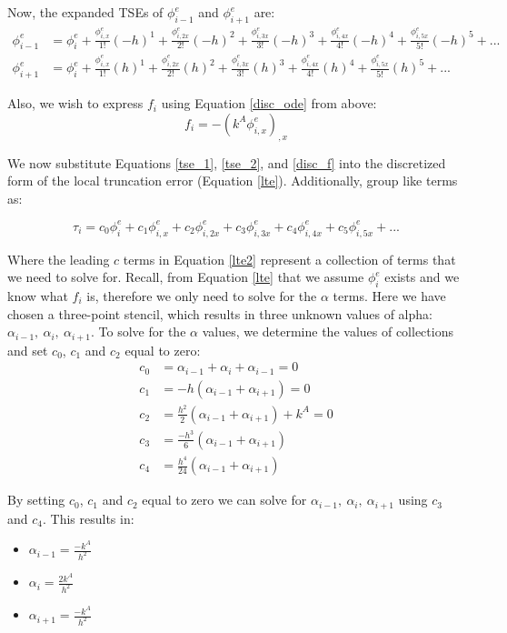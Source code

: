 \documentclass[letterpaper, 10pt, oneside]{article}
\newcommand{\be}{\begin{equation}}
\newcommand{\ee}{\end{equation}}
\newcommand{\as}[1]{\begin{align*}#1\end{align*}}
\newcommand{\an}[1]{\begin{align}#1\end{align}}
\newcommand{\bi}{\begin{itemize}}
\newcommand{\ei}{\end{itemize}}
\begin{document}
Now, the expanded TSEs of $\phi_{i-1}^e$ and $\phi_{i+1}^e$ are:
\an{
	\phi^e_{i-1} &= \phi^{e}_i + \frac{\phi^{e}_{i,x}}{1!}(-h)^1 + \frac{\phi^{e}_{i,2x}}{2!}(-h)^2 + \frac{\phi^{e}_{i,3x}}{3!}(-h)^3 + \frac{\phi^{e}_{i,4x}}{4!}(-h)^4 + \frac{\phi^{e}_{i,5x}}{5!}(-h)^5 + ...\label{tse_1} \\
	\phi^e_{i+1} &= \phi^{e}_i + \frac{\phi^{e}_{i,x}}{1!}(h)^1 + \frac{\phi^{e}_{i,2x}}{2!}(h)^2 + \frac{\phi^{e}_{i,3x}}{3!}(h)^3 + \frac{\phi^{e}_{i,4x}}{4!}(h)^4 + \frac{\phi^{e}_{i,5x}}{5!}(h)^5 + ...\label{tse_2}}

Also, we wish to express $f_i$ using Equation \ref{disc_ode} from above:
\be f_i = -(k^A \phi_{i,x}^e)_{,x} \label{disc_f} \ee

We now substitute Equations \ref{tse_1}, \ref{tse_2},  and \ref{disc_f} into the discretized form of the local truncation error (Equation \ref{lte}).  Additionally, group like terms as:

\be	\tau_i = c_0 \phi^e_{i} + c_1\phi^e_{i,x} +c_2 \phi^e_{i,2x} +c_3 \phi^e_{i,3x} + c_4 \phi^e_{i,4x} +c_5 \phi^e_{i,5x} + ...\label{lte2}\ee

Where the leading $c$ terms in Equation \ref{lte2} represent a collection of terms that we need to solve for.  Recall, from Equation \ref{lte} that we assume $\phi^e_i$ exists and we know what $f_i$ is, therefore we only need to solve for the $\alpha$ terms.  Here we have chosen a three-point stencil, which results in three unknown values of alpha: $\alpha_{i-1}, \ \alpha_i , \ \alpha_{i+1}$.  To solve for the $\alpha$ values, we determine the values of collections and set $c_0$, $c_1$ and $c_2$ equal to zero:
\as{c_0 &=\alpha_{i-1} + \alpha_i + \alpha_{i-1} = 0\\
	c_1&= -h \left( \alpha_{i-1} + \alpha_{i+1} \right) = 0 \\
	c_2&=\frac{h^2}{2}\left( \alpha_{i-1} + \alpha_{i+1} \right) + k^A = 0\\
	c_3&=\frac{-h^3}{6}\left( \alpha_{i-1} + \alpha_{i+1} \right) \\
	c_4&=\frac{h^4}{24}\left( \alpha_{i-1} + \alpha_{i+1} \right) }

 By setting $c_0$, $c_1$ and $c_2$ equal to zero we can solve for $\alpha_{i-1}, \ \alpha_i , \ \alpha_{i+1}$ using $c_3$ and $c_4$.  This results in: 
\bi
	\item $\alpha_{i-1} = \frac{-k^A}{h^2}$ 
	\item $\alpha_{i} = \frac{2k^A}{h^2 }$ 
	\item $\alpha_{i+1} = \frac{-k^A}{h^2}$
\ei
\end{document}
